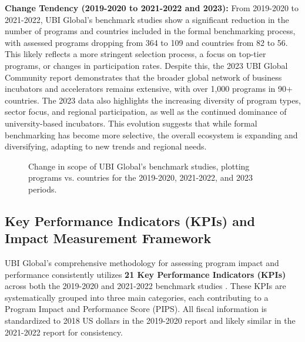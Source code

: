 \documentclass[../Main.tex]{subfiles}%
\begin{document}
	\textbf{Change Tendency (2019-2020 to 2021-2022 and 2023):}
	From 2019-2020 to 2021-2022, UBI Global's benchmark studies show a significant reduction in the number of programs and countries included in the formal benchmarking process, with assessed programs dropping from 364 to 109 and countries from 82 to 56. This likely reflects a more stringent selection process, a focus on top-tier programs, or changes in participation rates. Despite this, the 2023 UBI Global Community report demonstrates that the broader global network of business incubators and accelerators remains extensive, with over 1,000 programs in 90+ countries. The 2023 data also highlights the increasing diversity of program types, sector focus, and regional participation, as well as the continued dominance of university-based incubators. This evolution suggests that while formal benchmarking has become more selective, the overall ecosystem is expanding and diversifying, adapting to new trends and regional needs.
	
	\begin{figure}[h]
		\centering
		\caption{Change in scope of UBI Global's benchmark studies, plotting programs vs. countries for the 2019-2020, 2021-2022, and 2023 periods.}
		\label{fig:ubi_change_tendency}
	\end{figure}
	
	\subsection{Key Performance Indicators (KPIs) and Impact Measurement Framework}
	UBI Global's comprehensive methodology for assessing program impact and performance consistently utilizes \textbf{21 Key Performance Indicators (KPIs)} across both the 2019-2020 and 2021-2022 benchmark studies \cite{ubi2019world, ubi2021world}. These KPIs are systematically grouped into three main categories, each contributing to a Program Impact and Performance Score (PIPS). All fiscal information is standardized to 2018 US dollars in the 2019-2020 report and likely similar in the 2021-2022 report for consistency.
\end{document}
